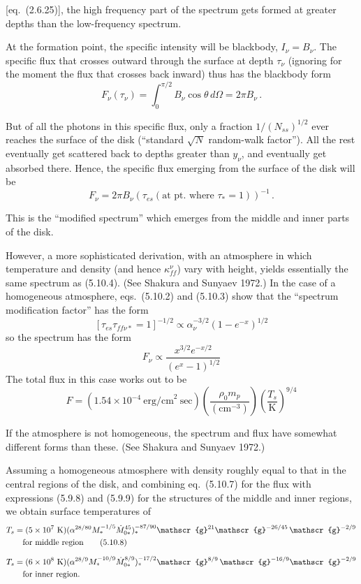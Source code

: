 [eq.\ (2.6.25)], the high frequency part of the spectrum gets formed at greater
depths than the low-frequency spectrum.

At the formation point, the specific intensity will be blackbody, $I_\nu = B_\nu$.  The
specific flux that crosses outward through the surface at depth $\tau_\nu$ (ignoring for
the moment the flux that crosses back inward) thus has the blackbody form
%
\[
F_\nu(\tau_\nu) = \int_0^{\pi/2} B_\nu \cos\theta \, d\Omega = 2\pi B_\nu\,.
\]

But of all the photons in this specific flux, only a fraction $1/(N_{ss})^{1/2}$ ever
reaches the surface of the disk (``standard $\sqrt{N}$ random-walk factor'').  All the
rest eventually get scattered back to depths greater than $y_\nu$, and eventually get
absorbed there.  Hence, the specific flux emerging from the surface of the disk
will be
%
\begin{equation}
\tag{5.10.4}
F_\nu = 2\pi B_\nu (\tau_{es}(\text{at pt.\ where } \tau_{*} = 1))^{-1}\,.
\end{equation}

This is the ``modified spectrum'' which emerges from the middle and inner parts
of the disk.

However, a more sophisticated derivation, with an atmosphere in which tempera\-ture
and density (and hence $\kappa_{ff}^{\nu}$) vary with height, yields essentially the same
spectrum as (5.10.4).  (See Shakura and Sunyaev 1972.)  In the case of a homo\-geneous
atmosphere, eqs.\ (5.10.2) and (5.10.3) show that the ``spectrum
modification factor'' has the form
%
\begin{equation}
\tag{5.10.5}
[\tau_{es}\tau_{ff\nu*} = 1]^{-1/2}
\propto \alpha_\nu^{-3/2}(1 - e^{-x})^{1/2}
\end{equation}
%
so the spectrum has the form
%
\[
F_\nu \propto \frac{x^{3/2} e^{-x/2}}{(e^x - 1)^{1/2}}
\]
%
The total flux in this case works out to be
%
\begin{equation}
\tag{5.10.6}
F = (1.54 \times 10^{-4}~\text{erg/cm}^2~\text{sec})
\left(\frac{\rho_0 m_p}{(\text{cm}^{-3})}\right)
\left(\frac{T_s}{\text{K}}\right)^{9/4}
\end{equation}

If the atmosphere is not homogeneous, the spectrum and flux have somewhat
different forms than these.  (See Shakura and Sunyaev 1972.)

Assuming a homogeneous atmosphere with density roughly equal to that in
the central regions of the disk, and combining eq.\ (5.10.7) for the flux with
expressions (5.9.8) and (5.9.9) for the structures of the middle and inner regions,
we obtain surface temperatures of
%
\begin{align}
T_s &= (5 \times 10^7~\text{K})(\alpha^{28/80}M_*^{-1/5}\dot{M}_{0*}^{45})_*^{-87/90}\mathscr{g}^{21}\mathscr{g}^{-26/45}\,\mathscr{g}^{-2/9}
\notag\\
&\quad \text{for middle region}
\tag{5.10.8}\\[6pt]
T_s &= (6 \times 10^8~\text{K})(\alpha^{28/9}M_*^{-10/9}\dot{M}_{0*}^{8/9})_*^{-17/2}\mathscr{g}^{8/9}\,\mathscr{g}^{-16/9}\mathscr{g}^{-2/9}
\notag\\
&\quad \text{for inner region.}
\notag
\end{align}

